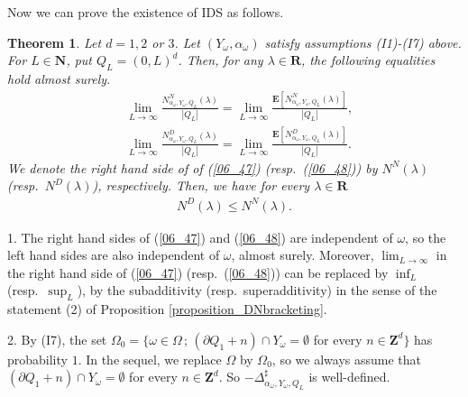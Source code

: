 \documentclass[12pt,a4paper]{article}
\newtheorem{theorem}{Theorem}[section]
\begin{document}
Now we can prove the existence of IDS as follows.
\begin{theorem}
\label{theorem_existence_IDS}
Let $d=1,2$ or $3$.
Let $(Y_\omega,\alpha_\omega)$ satisfy
assumptions (I1)-(I7) above.
For $L\in \mathbf{N}$,
put $Q_L=(0,L)^d$.
Then,
for any $\lambda\in \mathbf{R}$,
the following equalities hold almost surely.
\begin{align}
&\lim_{L\to\infty}\frac{N^N_{\alpha_\omega,Y_\omega,Q_L}(\lambda)}{|Q_L|}
=
\lim_{L\to\infty}\frac{\mathbf{E}[N^N_{\alpha_\omega,Y_\omega,Q_L}(\lambda)]}{|Q_L|},
\label{06_47}\\
&\lim_{L\to\infty}\frac{N^D_{\alpha_\omega,Y_\omega,Q_L}(\lambda)}{|Q_L|}
=
\lim_{L\to\infty} \frac{\mathbf{E}[N^D_{\alpha_\omega,Y_\omega,Q_L}(\lambda)]}{|Q_L|}.
\label{06_48}
\end{align}
We denote the right hand side of of (\ref{06_47}) (resp.\ (\ref{06_48}))
by $N^N(\lambda)$ (resp.\ $N^D(\lambda)$), respectively.
Then, we have for every $\lambda\in \mathbf{R}$
\begin{align}
\label{06_49}
 N^D(\lambda) \leq N^N(\lambda).
\end{align}
\end{theorem}
1. The right hand sides of (\ref{06_47}) and (\ref{06_48}) are independent of $\omega$,
so the left hand sides are also independent of $\omega$,
almost surely.
Moreover, 
$\lim_{L\to\infty}$ in the right hand side of (\ref{06_47}) (resp.\  (\ref{06_48}))
can be replaced by $\inf_L$ (resp.\ $\sup_L$),
by the subadditivity (resp.\ superadditivity)
in the sense of the statement (2) of Proposition \ref{proposition_DNbracketing}.

2. By (I7), the set $\Omega_0=\{\omega\in \Omega\,;\, (\partial Q_1+n)\cap Y_\omega=\emptyset$ for every $n\in \mathbf{Z}^d\}$ has probability $1$.
In the sequel, we replace $\Omega$ by $\Omega_0$,
so we always assume that $(\partial Q_1+n)\cap Y_\omega=\emptyset$
for every $n\in \mathbf{Z}^d$.
So $-\Delta^\sharp_{\alpha_\omega,Y_\omega,Q_L}$ is well-defined.
\end{document}
